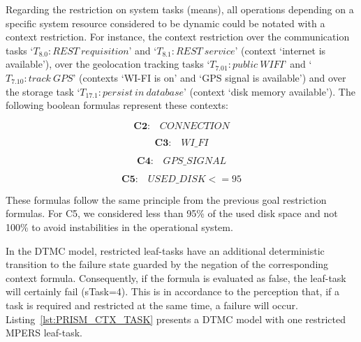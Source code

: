 Regarding the restriction on system tasks (means), all operations depending on a specific system resource considered to be dynamic could be notated with a context restriction. For instance, the context restriction over the communication tasks `$T_{8.0}: REST\ requisition$' and `$T_{8.1}:REST\ service$' (context `internet is available'), over the geolocation tracking tasks `$T_{7.01}: public\ WIFI$' and `$T_{7.10}: track\ GPS$' (contexts `WI-FI is on' and `GPS signal is available') and over the storage task `$T_{17.1}: persist\ in\ database$' (context `disk memory available'). The following boolean formulas represent these contexts: 

\begin{equation}\label{eq:C2}
\textbf{C2:}\quad CONNECTION
\end{equation}

\begin{equation}\label{eq:C3}
\textbf{C3:}\quad WI\_FI
\end{equation}

\begin{equation}\label{eq:C4}
\textbf{C4:}\quad GPS\_SIGNAL
\end{equation}

\begin{equation}\label{eq:C5}
\textbf{C5:}\quad USED\_DISK <= 95
\end{equation}

These formulas follow the same principle from the previous goal restriction formulas. For C5, we considered less than 95\% of the used disk space and not 100\% to avoid instabilities in the operational system. %

In the DTMC model, restricted leaf-tasks have an additional deterministic transition to the failure state guarded by the negation of the corresponding context formula. Consequently, if the formula is evaluated as false, the leaf-task will certainly fail (sTask=4). This is in accordance to the perception that, if a task is required and restricted at the same time, a failure will occur. Listing~\ref{lst:PRISM_CTX_TASK} presents a DTMC model with one restricted MPERS leaf-task.
\medskip

